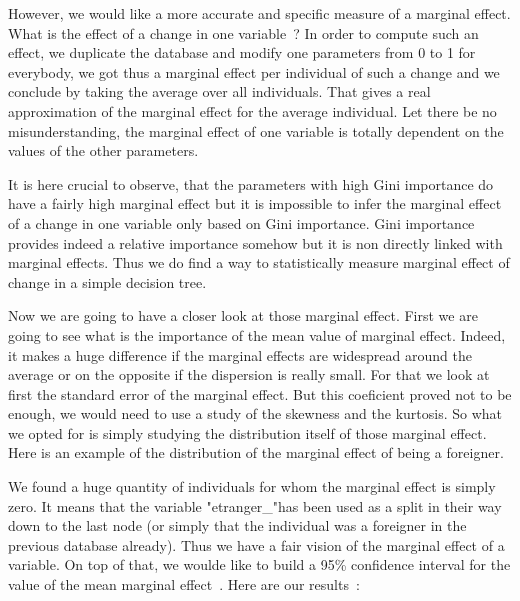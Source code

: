 

However, we would like a more accurate and specific measure of a marginal effect. What is the effect of a change in one variable ?
In order to compute such an effect, we duplicate the database and modify one parameters from 0 to 1 for everybody, we got thus a marginal effect per individual of such a change and we conclude by taking the average over all individuals. That gives a real approximation of the marginal  effect for the average individual. Let there be no misunderstanding, the marginal effect of one variable is totally dependent on the values of the other parameters.




It is here crucial to observe, that the parameters with high Gini importance do have a fairly high marginal effect but it is impossible to infer the marginal effect of a change in one variable only based on Gini importance. Gini importance provides indeed a relative importance somehow but it is non directly linked with marginal effects.
Thus we do find a way to statistically measure marginal effect of change in a simple decision tree.

Now we are going to have a closer look at those marginal effect.
First we are going to see what is the importance of the mean value of marginal effect. Indeed, it makes a huge difference if the marginal effects are widespread around the average or on the opposite if the dispersion is really small.
For that we look at first the standard error of the marginal effect. But this coeficient proved not to be enough, we would need to use a study of the skewness and the kurtosis. So what we opted for is simply studying the distribution itself of those marginal effect.
Here is an example of the distribution of the marginal effect of being a foreigner.



We found a huge quantity of individuals for whom the marginal effect is simply zero. It means that the variable "etranger\_"has been used as a split in their way down to the last node (or simply that the individual was a foreigner in the previous database already).
Thus we have a fair vision of the marginal effect of a variable.
On top of that, we woulde like to build a 95\% confidence interval for the value of the mean marginal effect . %
Here are our results :

